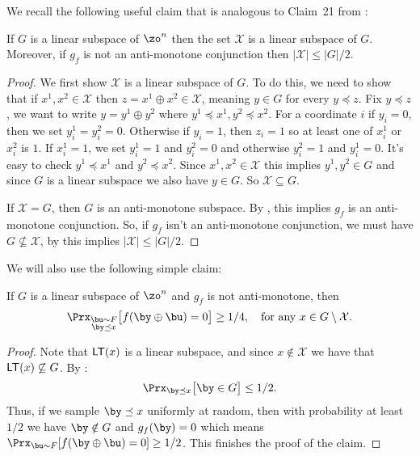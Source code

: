 \documentclass[11pt]{article}
\theoremstyle{definition}
\begin{document}
We recall the following useful claim that is analogous to Claim~21 from \cite{PRS02}:

\begin{claim} \label{lemma:PRS02} If $G$ is a {linear} subspace of $\zo^n$ then the set $\mathcal{X}$ is a {linear} subspace of $G$. Moreover, if $g_f$ is not an anti-monotone conjunction then $|\mathcal{X}|\leq  |G|/2$.
\end{claim} 
\begin{proof}
    We first show $\mathcal{X}$ is a linear subspace of $G$. To do this, we need to show that if $x^1,x^2 \in \mathcal{X}$ then $z=x^1 \oplus x^2 \in \mathcal{X}$, meaning $y \in G$ for every $y \preceq z$. Fix $y\preceq z$, we want to write $y=y^1 \oplus y^2$ where $y^1 \preceq x^1, y^2 \preceq x^2$. For a coordinate $i$ if $y_i=0$, then we set $y^1_i=y^2_i=0$. Otherwise if $y_i=1$, then $z_i=1$ so at least one of $x^1_i$ or $x^2_i$ is $1$. If $x^1_i=1$, we set $y^1_i=1$ and $y^2_i=0$ and otherwise  $y^2_i=1$ and $y^1_i=0$. It's easy to check $y^1 \preceq x^1$ and $y^2 \preceq x^2$. Since $x^1,x^2 \in \mathcal{X}$ this implies $y^1,y^2 \in G$ and since $G$ is a linear subspace we also have $y \in G$. So $\mathcal{X} \subseteq G$. 

    If $\mathcal{X}=G$, then $G$ is an anti-monotone subspace. By , this implies $g_f$ is an anti-monotone conjunction. So, if $g_f$ isn't an anti-monotone conjunction, we must have $G \not \subseteq \mathcal{X}$, by  this implies $|\mathcal{X}| \leq |G|/2$. 
\end{proof}










We will also use the following simple claim:
\begin{claim}\label{claim:yuv}
   If $G$ is a {linear} subspace of $\zo^n$ and $g_f$ is not anti-monotone, then 
$$\Prx_{\substack{\bu \sim F \\ \by \preceq x}}\big[f(\by \oplus \bu )=0\big] \geq 1/4,\quad\text{for any  $x \in {G} \setminus \mathcal{X}$.}$$
\end{claim}
\begin{proof}
    Note that $\textsf{LT}(x)$ is a {linear} subspace, and since $x \not \in \mathcal{X}$ we have that $\textsf{LT}(x) \not \subseteq G$. By : $$ \Prx_{\by \preceq x}\big[\by \in G\big] \leq 1/2.$$
     Thus, if we sample $\by \preceq x$ uniformly at random, then with probability at least $1/2$ we have  $\by\notin G$ and $g_f(\by)=0$ which means $\Prx_{\bu \sim F}[f(\by \oplus \bu )=0] \geq 1/2$.
This finishes the proof of the claim.
\end{proof}
\end{document}
